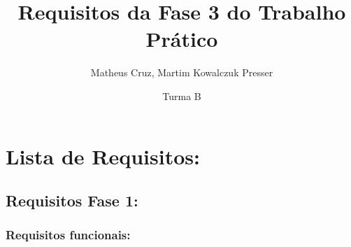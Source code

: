 \documentclass[12pt]{article}
\title{Requisitos da Fase 3 do Trabalho Prático}
\author{Matheus Cruz, Martim Kowalczuk Presser}
\date{Turma B}
\begin{document}
\maketitle

\tableofcontents
\newpage



\section{Lista de Requisitos:}

\subsection{Requisitos Fase 1:}

\subsubsection{Requisitos funcionais:}
\end{document}
